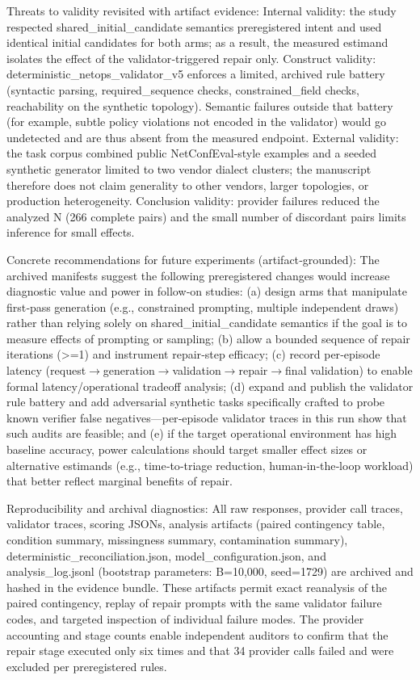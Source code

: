 \documentclass[conference]{IEEEtran}
\begin{document}
Threats to validity revisited with artifact evidence: Internal validity: the study respected shared\_initial\_candidate semantics preregistered intent and used identical initial candidates for both arms; as a result, the measured estimand isolates the effect of the validator‑triggered repair only. Construct validity: deterministic\_netops\_validator\_v5 enforces a limited, archived rule battery (syntactic parsing, required\_sequence checks, constrained\_field checks, reachability on the synthetic topology). Semantic failures outside that battery (for example, subtle policy violations not encoded in the validator) would go undetected and are thus absent from the measured endpoint. External validity: the task corpus combined public NetConfEval‑style examples and a seeded synthetic generator limited to two vendor dialect clusters; the manuscript therefore does not claim generality to other vendors, larger topologies, or production heterogeneity. Conclusion validity: provider failures reduced the analyzed N (266 complete pairs) and the small number of discordant pairs limits inference for small effects.

Concrete recommendations for future experiments (artifact‑grounded): The archived manifests suggest the following preregistered changes would increase diagnostic value and power in follow‑on studies: (a) design arms that manipulate first‑pass generation (e.g., constrained prompting, multiple independent draws) rather than relying solely on shared\_initial\_candidate semantics if the goal is to measure effects of prompting or sampling; (b) allow a bounded sequence of repair iterations (>=1) and instrument repair‑step efficacy; (c) record per‑episode latency (request\ensuremath{\rightarrow}generation\ensuremath{\rightarrow}validation\ensuremath{\rightarrow}repair\ensuremath{\rightarrow}final validation) to enable formal latency/operational tradeoff analysis; (d) expand and publish the validator rule battery and add adversarial synthetic tasks specifically crafted to probe known verifier false negatives---per‑episode validator traces in this run show that such audits are feasible; and (e) if the target operational environment has high baseline accuracy, power calculations should target smaller effect sizes or alternative estimands (e.g., time‑to‑triage reduction, human‑in‑the‑loop workload) that better reflect marginal benefits of repair.

Reproducibility and archival diagnostics: All raw responses, provider call traces, validator traces, scoring JSONs, analysis artifacts (paired contingency table, condition summary, missingness summary, contamination summary), deterministic\_reconciliation.json, model\_configuration.json, and analysis\_log.jsonl (bootstrap parameters: B=10,000, seed=1729) are archived and hashed in the evidence bundle. These artifacts permit exact reanalysis of the paired contingency, replay of repair prompts with the same validator failure codes, and targeted inspection of individual failure modes. The provider accounting and stage counts enable independent auditors to confirm that the repair stage executed only six times and that 34 provider calls failed and were excluded per preregistered rules.
\end{document}
